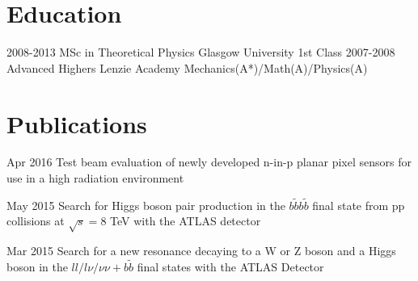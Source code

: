 \documentclass[]{twentysecondcv}
\begin{document}

\section*{Education}

\begin{twenty}
  \twentyitem
    {2008-2013}
    {MSc in Theoretical Physics }
    {Glasgow University}
    {1st Class}
  \twentyitem
    {2007-2008}
    {Advanced Highers}
    {Lenzie Academy}
    {Mechanics(A*)/Math(A)/Physics(A)}
\end{twenty}



\section*{Publications}

\begin{twentyshort}
  \twentyitemshort
    {Apr 2016}
    {Test beam evaluation of newly developed n-in-p planar pixel sensors for use in a high radiation environment}
\end{twentyshort}

\begin{twentyshort}
  \twentyitemshort
    {May 2015}
    {Search for Higgs boson pair production in the $b\tilde{b}b\tilde{b}$ final state from pp collisions at $\sqrt{s}=8$ TeV with the ATLAS detector}
\end{twentyshort}

\begin{twentyshort}
  \twentyitemshort
    {Mar 2015}
    {Search for a new resonance decaying to a W or Z boson and a Higgs boson in the $ll/l\nu/\nu\nu+b\tilde{b}$ final states with the ATLAS Detector}
\end{twentyshort}
\end{document}

